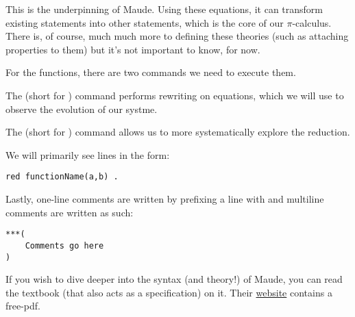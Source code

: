 This is the underpinning of Maude. Using these equations, it can transform existing statements into other statements, which is the core of our $\pi$-calculus. There is, of course, much much more to defining these theories (such as attaching properties to them) but it's not important to know, for now.

For the functions, there are two commands we need to execute them.

The  (short for ) command performs rewriting on equations, which we will use to observe the evolution of our systme.

The  (short for ) command allows us to more systematically explore the reduction. 

We will primarily see lines in the form:

\begin{verbatim}
red functionName(a,b) .
\end{verbatim}

Lastly, one-line comments are written by prefixing a line with \code{---} and multiline comments are written as such:
\begin{verbatim}
***(
    Comments go here
)
\end{verbatim}

If you wish to dive deeper into the syntax (and theory!) of Maude, you can read the textbook \cite{maude} (that also acts as a specification) on it. Their \href{http://maude.cs.illinois.edu/}{website} contains a free-pdf.